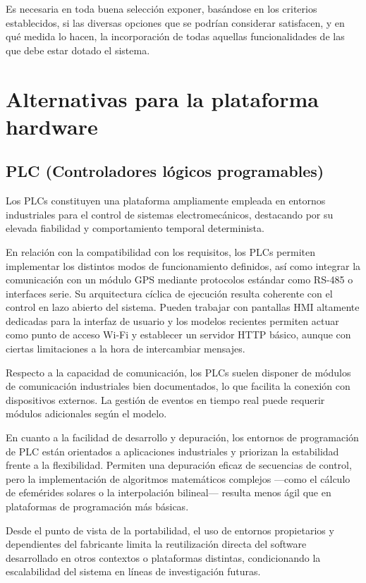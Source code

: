 Es necesaria en toda buena selección exponer, basándose en los criterios establecidos, si las diversas opciones que se podrían considerar satisfacen, y en qué medida lo hacen, la incorporación de todas aquellas funcionalidades de las que debe estar dotado el sistema. 


\section{Alternativas para la plataforma hardware}

\subsection{PLC (Controladores lógicos programables)}

Los PLCs constituyen una plataforma ampliamente empleada en entornos industriales para el control de sistemas electromecánicos, destacando por su elevada fiabilidad y comportamiento temporal determinista. 

En relación con la compatibilidad con los requisitos, los PLCs permiten implementar los distintos modos de funcionamiento definidos, así como integrar la comunicación con un módulo GPS mediante protocolos estándar como RS-485 o interfaces serie. Su arquitectura cíclica de ejecución resulta coherente con el control en lazo abierto del sistema. Pueden trabajar con pantallas HMI altamente dedicadas para la interfaz de usuario y los modelos recientes permiten actuar como punto de acceso Wi-Fi y establecer un servidor HTTP básico, aunque con ciertas limitaciones a la hora de intercambiar mensajes.

Respecto a la capacidad de comunicación, los PLCs suelen disponer de módulos de comunicación industriales bien documentados, lo que facilita la conexión con dispositivos externos. La gestión de eventos en tiempo real puede requerir módulos adicionales según el modelo.

En cuanto a la facilidad de desarrollo y depuración, los entornos de programación de PLC están orientados a aplicaciones industriales y priorizan la estabilidad frente a la flexibilidad. Permiten una depuración eficaz de secuencias de control, pero la implementación de algoritmos matemáticos complejos —como el cálculo de efemérides solares o la interpolación bilineal— resulta menos ágil que en plataformas de programación más básicas.

Desde el punto de vista de la portabilidad, el uso de entornos propietarios y dependientes del fabricante limita la reutilización directa del software desarrollado en otros contextos o plataformas distintas, condicionando la escalabilidad del sistema en líneas de investigación futuras.

